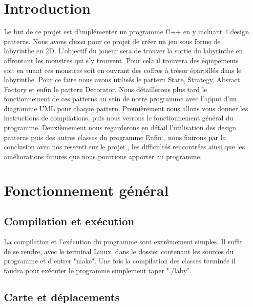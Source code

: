 \documentclass[a4paper]{article}
\author{\docsauthor}
\title{\docstitle}
\date{\today}
\begin{document}
  \maketitle{}
  \thispagestyle{empty}
  \newpage
  \LARGE{\tableofcontents{}}
  \normalsize{}
  \newpage
  \section{Introduction}

Le but de ce projet est d’implémenter un programme C++ en y incluant 4 design patterns.
Nous avons choisi pour ce projet de créer un jeu sous forme de labyrinthe en 2D.
L'objectif du joueur sera de trouver la sortie du labyrinthe en affrontant les monstres qui s'y trouvent.
Pour cela il trouvera des équipements soit en tuant ces monstres soit en ouvrant des coffres à trésor éparpillés dans le labyrinthe.
Pour ce faire nous avons utilisés le pattern State, Strategy, Absract Factory et enfin le pattern Decorator.
Nous détaillerons plus tard le fonctionnement de ces patterns au sein de notre programme avec l'appui d'un diagramme UML pour chaque pattern.
Premièrement nous allons vous donner les instructions de compilations, puis nous verrons le fonctionnement général du programme.
Deuxièmement nous regarderons en détail l'utilisation des design patterns puis des autres classes du programme
Enfin , nous finirons par la conclusion avec nos ressenti sur le projet , les difficultés rencontrées ainsi que les améliorations futures que nous pourrions apporter au programme.


  \section{Fonctionnement général}

    \subsection{Compilation et exécution}

La compilation et l’exécution du programme sont extrêmement simples.
Il suffit de se rendre, avec le terminal Linux, dans le dossier contenant les sources du programme et d'entrer "make".
Une fois la compilation des classes terminée il faudra pour exécuter le programme simplement taper "./laby".


    \subsection{Carte et déplacements}
\end{document}
